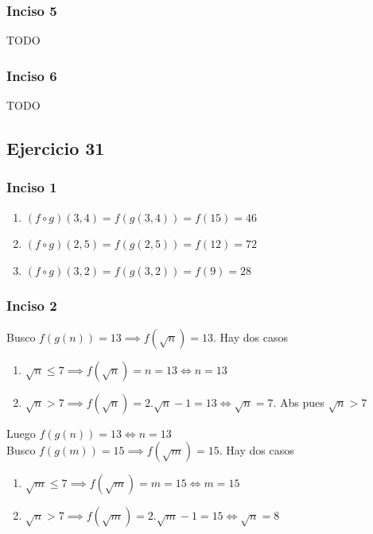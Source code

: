 \subsubsection{Inciso 5}
TODO

\subsubsection{Inciso 6}
TODO

\subsection{Ejercicio 31}

\subsubsection{Inciso 1}

\begin{enumerate}[label=(\alph*)]
    \item $(f \circ g)(3,4) = f(g(3,4)) = f(15) = 46$
    \item $(f \circ g)(2,5) = f(g(2,5)) = f(12) = 72$
    \item $(f \circ g)(3,2) = f(g(3,2)) = f(9) = 28$
\end{enumerate}

\subsubsection{Inciso 2}

Busco $f(g(n)) = 13 \implies f(\sqrt{n}) = 13$. Hay dos casos

\begin{enumerate}
    \item $\sqrt{n} \leq 7 \implies f(\sqrt{n}) = n = 13 \iff n = 13$
    \item $\sqrt{n} > 7 \implies f(\sqrt{n}) = 2. \sqrt{n} - 1 = 13 \iff \sqrt{n} = 7$. Abs pues $\sqrt{n} > 7$
\end{enumerate}

Luego $f(g(n)) = 13 \iff n = 13$
\\

Busco $f(g(m)) = 15 \implies f(\sqrt{m}) = 15$. Hay dos casos

\begin{enumerate}
    \item $\sqrt{m} \leq 7 \implies f(\sqrt{m}) = m = 15 \iff m = 15$
    \item $\sqrt{n} > 7 \implies f(\sqrt{m}) = 2. \sqrt{m} - 1 = 15 \iff \sqrt{n} = 8$
\end{enumerate}

